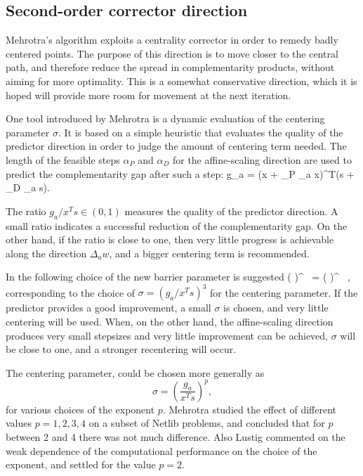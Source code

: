 %
%
\subsection{Second-order corrector direction}

Mehrotra's algorithm exploits a centrality corrector in order to 
remedy badly centered points. The purpose of this direction is 
to move closer to the central path, and therefore reduce the spread 
in complementarity products, without aiming for more optimality. 
This is a somewhat conservative direction, which it is hoped will 
provide more room for movement at the next iteration.

One tool introduced by Mehrotra \cite{Mehrotra92} is a dynamic evaluation 
of the centering parameter $\sigma$. It is based on a simple  
heuristic that evaluates the quality of the predictor direction
in order to judge the amount of centering term needed.
%
The length of the feasible steps $\alpha_P$ and $\alpha_D$
for the affine-scaling direction are used to 
predict the complementarity gap after such a step:
\be \label{eq:PredictedGap}
  g_a = (x + \alpha_P \Delta_a x)^T(s + \alpha_D \Delta_a s).
\ee

The ratio $g_a / x^{T}s \in (0,1)$ measures the quality of the 
predictor direction.
A small ratio indicates a successful reduction of the complementarity 
gap. On the other hand, if the ratio is close to one, then very little 
progress is achievable along the direction $\Delta_a w$,
and a bigger centering term
is recommended.

In \cite{Mehrotra92} the following choice of the new barrier parameter 
is suggested
%
\be \label{eq:Mu}
  \left(  \right)^{} \, 
           = \left(  \right)^{} \, ,
\ee
%
corresponding to the choice of $\sigma = (g_a / x^Ts)^3$ 
for the centering parameter. 
If the predictor provides a good improvement, a small $\sigma$ 
is chosen, and very little centering will be used. When, 
on the other hand, the affine-scaling direction produces very small stepsizes 
and very little improvement can be achieved, $\sigma$ will be 
close to one, and a stronger recentering will occur.

The centering parameter, could be chosen more generally as
\[
  \sigma = \left( \frac{g_a}{x^Ts} \right)^p\!\!,
\]
for various choices of the exponent $p$. Mehrotra \cite{Mehrotra92}
studied the effect of different values $p=1,2,3,4$
on a subset of Netlib problems, and concluded that for $p$ between
2 and 4 there was not much difference.
Also Lustig \etal \cite{LustigMarstenShanno} commented on the
weak dependence of the computational performance on the choice 
of the exponent, and settled for the value $p=2$.

